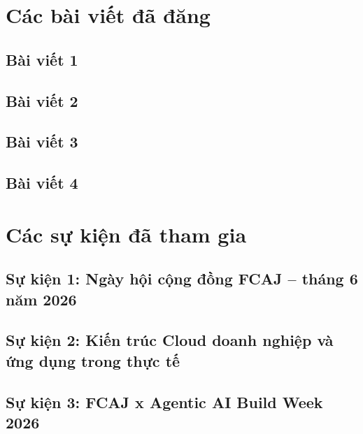 

\newpage

\section{Các bài viết đã đăng}



\subsection{Bài viết 1}


\subsection{Bài viết 2}


\subsection{Bài viết 3}


\subsection{Bài viết 4}


\newpage

\section{Các sự kiện đã tham gia}



\subsection{Sự kiện 1: Ngày hội cộng đồng FCAJ – tháng 6 năm 2026}


\subsection{Sự kiện 2: Kiến trúc Cloud doanh nghiệp và ứng dụng trong thực tế}


\subsection{Sự kiện 3: FCAJ x Agentic AI Build Week 2026}


